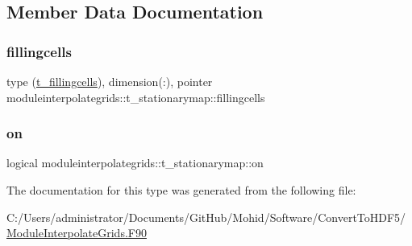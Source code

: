 \subsection{Member Data Documentation}
\mbox{\label{structmoduleinterpolategrids_1_1t__stationarymap_a8e83c24e75b6a4f2068129ad0a51c511}} 
\subsubsection{\texorpdfstring{fillingcells}{fillingcells}}
{\footnotesize\ttfamily type (\mbox{\hyperlink{structmoduleinterpolategrids_1_1t__fillingcells}{t\+\_\+fillingcells}}), dimension(\+:), pointer moduleinterpolategrids\+::t\+\_\+stationarymap\+::fillingcells\hspace{0.3cm}{\ttfamily [private]}}

\mbox{\label{structmoduleinterpolategrids_1_1t__stationarymap_a145bee0a647996b98282da4d8e1685de}} 
\subsubsection{\texorpdfstring{on}{on}}
{\footnotesize\ttfamily logical moduleinterpolategrids\+::t\+\_\+stationarymap\+::on\hspace{0.3cm}{\ttfamily [private]}}



The documentation for this type was generated from the following file\+:\begin{DoxyCompactItemize}
\item 
C\+:/\+Users/administrator/\+Documents/\+Git\+Hub/\+Mohid/\+Software/\+Convert\+To\+H\+D\+F5/\mbox{\hyperlink{_module_interpolate_grids_8_f90}{Module\+Interpolate\+Grids.\+F90}}\end{DoxyCompactItemize}
